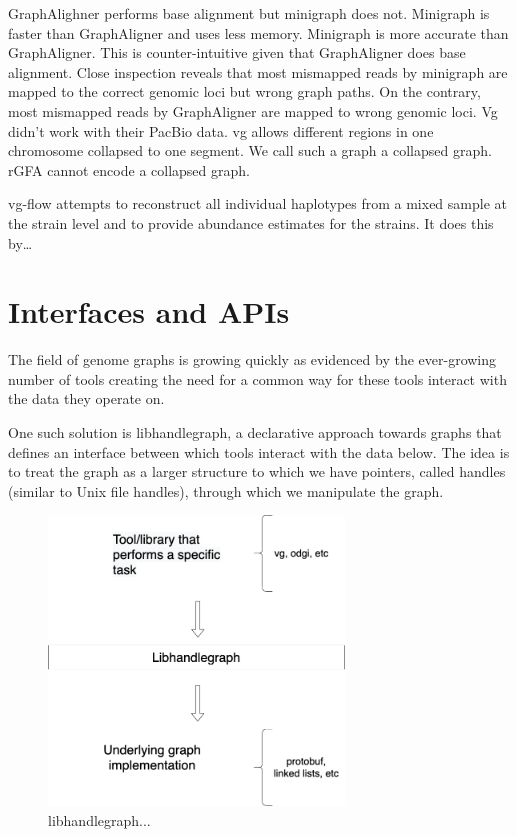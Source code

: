 \documentclass[11pt]{article}
\begin{document}
GraphAlighner performs base alignment but minigraph does not. Minigraph is
faster than GraphAligner and uses less memory. Minigraph is more accurate than
GraphAligner. This is counter-intuitive given that GraphAligner does base alignment. 
Close inspection reveals that most mismapped reads by minigraph are mapped to the
correct genomic loci but wrong graph paths. On the contrary, most mismapped
reads by GraphAligner are mapped to wrong genomic loci. Vg didn’t work with 
their PacBio data. vg allows different regions in one chromosome collapsed to one
segment. We call such a graph a collapsed graph. rGFA cannot encode a collapsed
graph.

vg-flow \cite{baaijensStrainawareAssemblyGenomes2020} attempts to reconstruct all 
individual haplotypes from a mixed sample at the strain level and to provide
abundance estimates for the strains. It does this by\ldots{}

\section{Interfaces and APIs}
\label{sec:org35c7c7b}
The field of genome graphs is growing quickly as evidenced by the ever-growing
number of tools creating the need for a common way for these tools interact with
the data they operate on.

One such solution is libhandlegraph, a declarative approach towards graphs that
defines an interface between which tools interact with the data below. 
The idea is to treat the graph as a larger structure to which we have pointers,
called handles (similar to  Unix file handles), through which we manipulate the
graph. 

\begin{figure}[h]
\centering
\includegraphics[width=0.7\textwidth]{assets/images/libhandlegraph.png}
\caption{libhandlegraph...}
\end{figure}
\end{document}
